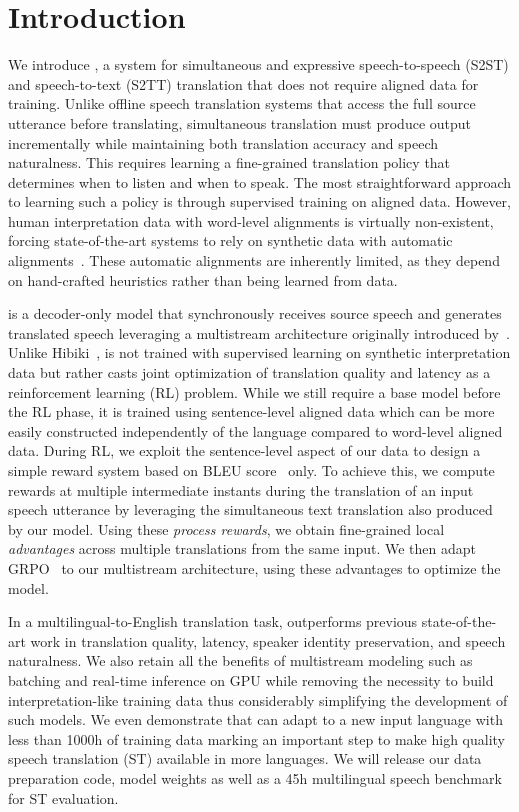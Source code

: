 \section{Introduction}
\label{introduction}

We introduce \ours{}, a system for simultaneous and expressive speech-to-speech (S2ST) and speech-to-text (S2TT) translation that does not require aligned data for training. Unlike offline speech translation systems that access the full source utterance before translating, simultaneous translation must produce output incrementally while maintaining both translation accuracy and speech naturalness. This requires learning a fine-grained translation policy that determines when to listen and when to speak. The most straightforward approach to learning such a policy is through supervised training on aligned data. However, human interpretation data with word-level alignments is virtually non-existent, forcing state-of-the-art systems to rely on synthetic data with automatic alignments~\cite{hibiki}. These automatic alignments are inherently limited, as they depend on hand-crafted heuristics rather than being learned from data.


\ours{} is a decoder-only model that synchronously receives source speech and generates translated speech leveraging a multistream architecture originally introduced by~\citet{moshi}. Unlike Hibiki~\cite{hibiki}, \ours{} is not trained with supervised learning on synthetic interpretation data but rather casts joint optimization of translation quality and latency as a reinforcement learning (RL) problem. While we still require a base model before the RL phase, it is trained using sentence-level aligned data which can be more easily constructed independently of the language compared to word-level aligned data. During RL, we exploit the sentence-level aspect of our data to design a simple reward system based on BLEU score~\cite{bleu} only. To achieve this, we compute rewards at multiple intermediate instants during the translation of an input speech utterance by leveraging the simultaneous text translation also produced by our model. Using these \textit{process rewards}, we obtain fine-grained local \textit{advantages} across multiple translations from the same input. We then adapt GRPO~\cite{grpo} to our multistream architecture, using these advantages to optimize the model.

In a multilingual-to-English translation task, \ours{} outperforms previous state-of-the-art work in translation quality, latency, speaker identity preservation, and speech naturalness. We also retain all the benefits of multistream modeling such as batching and real-time inference on GPU while removing the necessity to build interpretation-like training data thus considerably simplifying the development of such models. We even demonstrate that \ours{} can adapt to a new input language with less than 1000h of training data marking an important step to make high quality speech translation (ST) available in more languages. We will release our data preparation code, model weights as well as a 45h multilingual speech benchmark for ST evaluation. 